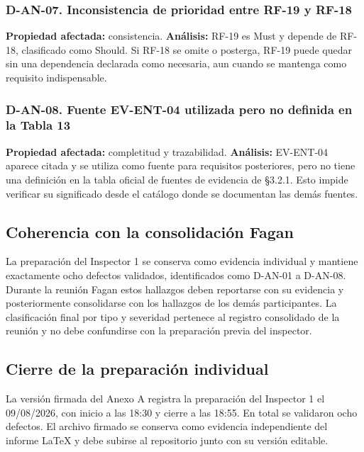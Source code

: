 \documentclass[12pt,a4paper]{article}
\begin{document}
\subsubsection{D-AN-07. Inconsistencia de prioridad entre RF-19 y RF-18}
\textbf{Propiedad afectada:} consistencia.  
\textbf{Análisis:} RF-19 es Must y depende de RF-18, clasificado como Should. Si RF-18 se omite o posterga, RF-19 puede quedar sin una dependencia declarada como necesaria, aun cuando se mantenga como requisito indispensable.

\subsubsection{D-AN-08. Fuente EV-ENT-04 utilizada pero no definida en la Tabla 13}
\textbf{Propiedad afectada:} completitud y trazabilidad.  
\textbf{Análisis:} EV-ENT-04 aparece citada y se utiliza como fuente para requisitos posteriores, pero no tiene una definición en la tabla oficial de fuentes de evidencia de §3.2.1. Esto impide verificar su significado desde el catálogo donde se documentan las demás fuentes.

\subsection{Coherencia con la consolidación Fagan}

La preparación del Inspector 1 se conserva como evidencia individual y mantiene exactamente ocho defectos validados, identificados como D-AN-01 a D-AN-08. Durante la reunión Fagan estos hallazgos deben reportarse con su evidencia y posteriormente consolidarse con los hallazgos de los demás participantes. La clasificación final por tipo y severidad pertenece al registro consolidado de la reunión y no debe confundirse con la preparación previa del inspector.

\subsection{Cierre de la preparación individual}

La versión firmada del Anexo A registra la preparación del Inspector 1 el 09/08/2026, con inicio a las 18:30 y cierre a las 18:55. En total se validaron ocho defectos. El archivo firmado se conserva como evidencia independiente del informe LaTeX y debe subirse al repositorio junto con su versión editable.
\end{document}

